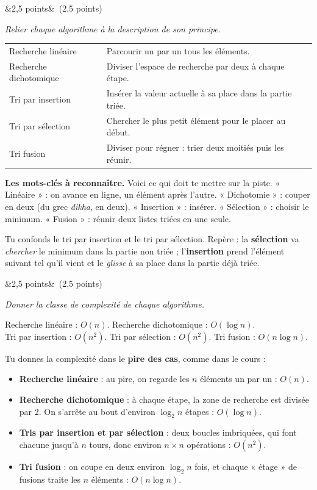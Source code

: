 \documentclass[11pt, a4paper]{exam}
\newcommand{\Q}[3]{\par\needspace{5\baselineskip}\bigskip\noindent{\large\bfseries Question #1}\ifx&#2&\else\ \textnormal{(#2)}\fi\par\nopagebreak\smallskip\noindent\textit{#3}\par\nopagebreak\smallskip}
\begin{document}
\Q{2}{2,5 points}{Relier chaque algorithme à la description de son principe.}
\begin{reponse}
\renewcommand{\arraystretch}{1.2}
\begin{tabular}{@{}l@{\ $\longrightarrow$\ }l@{}}
Recherche linéaire & Parcourir un par un tous les éléments. \\
Recherche dichotomique & Diviser l'espace de recherche par deux à chaque étape. \\
Tri par insertion & Insérer la valeur actuelle à sa place dans la partie triée. \\
Tri par sélection & Chercher le plus petit élément pour le placer au début. \\
Tri fusion & Diviser pour régner : trier deux moitiés puis les réunir. \\
\end{tabular}
\end{reponse}
\textbf{Les mots-clés à reconnaître.} Voici ce qui doit te mettre sur la piste. « Linéaire » : on avance en ligne, un élément après l'autre. « Dichotomie » : couper en deux (du grec \emph{dikha}, en deux). « Insertion » : insérer. « Sélection » : choisir le minimum. « Fusion » : réunir deux listes triées en une seule.
\begin{erreur}
Tu confonds le tri par insertion et le tri par sélection. Repère : la \textbf{sélection} va \emph{chercher} le minimum dans la partie non triée ; l'\textbf{insertion} prend l'élément suivant tel qu'il vient et le \emph{glisse} à sa place dans la partie déjà triée.
\end{erreur}

\Q{3}{2,5 points}{Donner la classe de complexité de chaque algorithme.}
\begin{reponse}
Recherche linéaire : $O(n)$. \quad Recherche dichotomique : $O(\log n)$. \\
Tri par insertion : $O(n^2)$. \quad Tri par sélection : $O(n^2)$. \quad Tri fusion : $O(n \log n)$.
\end{reponse}
Tu donnes la complexité dans le \textbf{pire des cas}, comme dans le cours :
\begin{itemize}
\item \textbf{Recherche linéaire} : au pire, on regarde les $n$ éléments un par un : $O(n)$.
\item \textbf{Recherche dichotomique} : à chaque étape, la zone de recherche est divisée par 2. On s'arrête au bout d'environ $\log_2 n$ étapes : $O(\log n)$.
\item \textbf{Tris par insertion et par sélection} : deux boucles imbriquées, qui font chacune jusqu'à $n$ tours, donc environ $n \times n$ opérations : $O(n^2)$.
\item \textbf{Tri fusion} : on coupe en deux environ $\log_2 n$ fois, et chaque « étage » de fusions traite les $n$ éléments : $O(n \log n)$.
\end{itemize}
\end{document}
